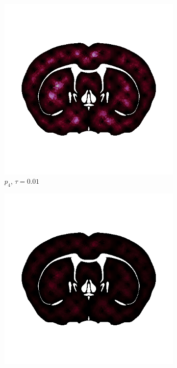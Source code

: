 \begin{figure}[h!]
  \begin{subfigure}[b]{0.24\textwidth}
    \includegraphics[width=\textwidth,height=\textheight,keepaspectratio,height=\textheight,keepaspectratio]{figures/4_mpet/biomedical/time/eta4_p4_dt1.png}
    \caption{$p_4$, $\tau=0.01$}
  \end{subfigure}
  \begin{subfigure}[b]{0.24\textwidth}
    \includegraphics[width=\textwidth,height=\textheight,keepaspectratio,height=\textheight,keepaspectratio]{figures/4_mpet/biomedical/time/eta4_p4_dt2.png}

\end{subfigure}
\end{figure}

